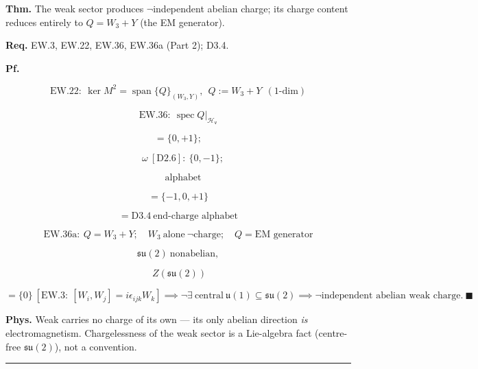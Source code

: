 \begin{theorem}\label{tag:FT-12}
\textbf{Thm.} The weak sector produces $\neg$independent abelian charge; its charge content reduces entirely to $Q=W_3+Y$ (the EM generator).

\textbf{Req.} EW.3, EW.22, EW.36, EW.36a (Part 2); D3.4.

\textbf{Pf.}

\[
\mathrm{EW.22}:\ \ker M^2=\operatorname{span}\{Q\}_{(W_3,Y)},\ \ Q:=W_3+Y\ \ (1\text{-dim})
\]

\[
\mathrm{EW.36}:\ \operatorname{spec}Q|_{\mathcal H_{\mathsf v}}
\]

\[
= \{0,+1\};
\]

\[
\quad\omega\ [\mathrm{D2.6}]:\ \{0,-1\};
\]

\[
\quad\text{alphabet}
\]

\[
= \{-1,0,+1\}
\]

\[
= \mathrm{D3.4}\ \text{end-charge alphabet}
\]

\[
\mathrm{EW.36a}:\ Q=W_3+Y;\quad W_3\ \text{alone}\ \neg\text{charge};\quad Q=\text{EM generator}
\]

\[
\mathfrak{su}(2)\ \text{nonabelian},
\]

\[
\ Z(\mathfrak{su}(2))
\]

\[
= \{0\}\ [\mathrm{EW.3}:\ [W_i,W_j]=i\epsilon_{ijk}W_k]\implies\neg\exists\ \text{central}\ \mathfrak u(1)\subseteq\mathfrak{su}(2)\implies\neg\text{independent abelian weak charge}.\ \blacksquare
\]

\textbf{Phys.} Weak carries no charge of its own — its only abelian direction \textit{is} electromagnetism. Chargelessness of the weak sector is a Lie-algebra fact (centre-free $\mathfrak{su}(2)$), not a convention.

\vspace{2pt}\noindent\rule{\textwidth}{0.4pt}\vspace{2pt}

\end{theorem}

